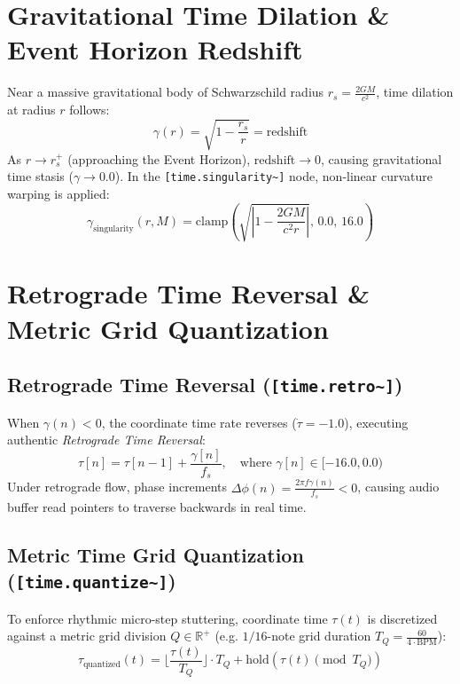 \documentclass[11pt,a4paper]{article}
\begin{document}
\section{Gravitational Time Dilation \& Event Horizon Redshift}
Near a massive gravitational body of Schwarzschild radius $r_s = \frac{2GM}{c^2}$, time dilation at radius $r$ follows:
\begin{equation}
\gamma(r) = \sqrt{1 - \frac{r_s}{r}} = \text{redshift}
\end{equation}
As $r \to r_s^+$ (approaching the Event Horizon), $\text{redshift} \to 0$, causing gravitational time stasis ($\gamma \to 0.0$). In the \texttt{[time.singularity\textasciitilde{}]} node, non-linear curvature warping is applied:
\begin{equation}
\gamma_{\text{singularity}}(r, M) = \text{clamp}\left( \sqrt{\left| 1 - \frac{2GM}{c^2 r} \right|}, \, 0.0, \, 16.0 \right)
\end{equation}

\section{Retrograde Time Reversal \& Metric Grid Quantization}
\subsection{Retrograde Time Reversal (\texttt{[time.retro\textasciitilde{}]})}
When $\gamma(n) < 0$, the coordinate time rate reverses ($\dot{\tau} = -1.0$), executing authentic \textit{Retrograde Time Reversal}:
\begin{equation}
\tau[n] = \tau[n-1] + \frac{\gamma[n]}{f_s}, \quad \text{where } \gamma[n] \in [-16.0, 0.0)
\end{equation}
Under retrograde flow, phase increments $\Delta \phi(n) = \frac{2\pi f \gamma(n)}{f_s} < 0$, causing audio buffer read pointers to traverse backwards in real time.

\subsection{Metric Time Grid Quantization (\texttt{[time.quantize\textasciitilde{}]})}
To enforce rhythmic micro-step stuttering, coordinate time $\tau(t)$ is discretized against a metric grid division $Q \in \mathbb{R}^+$ (e.g. $1/16$-note grid duration $T_Q = \frac{60}{4 \cdot \text{BPM}}$):
\begin{equation}
\tau_{\text{quantized}}(t) = \lfloor \frac{\tau(t)}{T_Q} \rfloor \cdot T_Q + \text{hold}\left(\tau(t) \pmod{T_Q}\right)
\end{equation}
\end{document}

